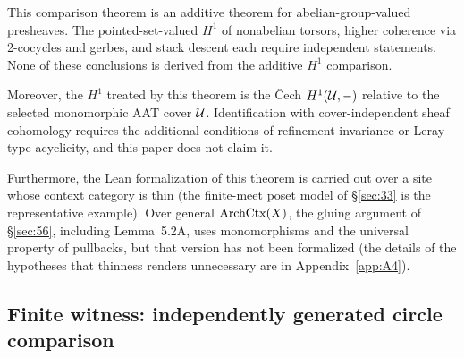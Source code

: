 This comparison theorem is an additive theorem for
abelian-group-valued presheaves. The pointed-set-valued $H^1$ of
nonabelian torsors, higher coherence via 2-cocycles and gerbes, and
stack descent each require independent statements. None of these
conclusions is derived from the additive $H^1$ comparison.

Moreover, the $H^1$ treated by this theorem is the \v{C}ech
$H^1(\mathcal{U},-)$ relative to the selected monomorphic AAT cover $\mathcal{U}$.
Identification with cover-independent sheaf cohomology requires the
additional conditions of refinement invariance or Leray-type
acyclicity, and this paper does not claim it.

Furthermore, the Lean formalization of this theorem is carried out
over a site whose context category is thin (the finite-meet poset
model of \S\ref{sec:33} is the representative example). Over general
$\mathrm{ArchCtx}(X)$, the gluing argument of \S\ref{sec:56}, including
Lemma~5.2A, uses monomorphisms and the universal property of
pullbacks, but that version has not been formalized (the details of
the hypotheses that thinness renders unnecessary are in
Appendix~\ref{app:A4}).

\subsection{Finite witness: independently generated circle comparison}\label{sec:58}

